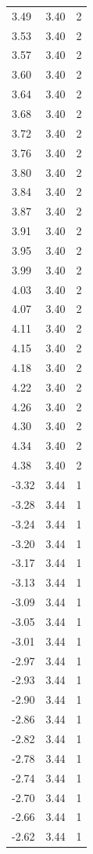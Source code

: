 \begin{longtable}{lrr}
  3.49 & 3.40 & 2 \\
  3.53 & 3.40 & 2 \\
  3.57 & 3.40 & 2 \\
  3.60 & 3.40 & 2 \\
  3.64 & 3.40 & 2 \\
  3.68 & 3.40 & 2 \\
  3.72 & 3.40 & 2 \\
  3.76 & 3.40 & 2 \\
  3.80 & 3.40 & 2 \\
  3.84 & 3.40 & 2 \\
  3.87 & 3.40 & 2 \\
  3.91 & 3.40 & 2 \\
  3.95 & 3.40 & 2 \\
  3.99 & 3.40 & 2 \\
  4.03 & 3.40 & 2 \\
  4.07 & 3.40 & 2 \\
  4.11 & 3.40 & 2 \\
  4.15 & 3.40 & 2 \\
  4.18 & 3.40 & 2 \\
  4.22 & 3.40 & 2 \\
  4.26 & 3.40 & 2 \\
  4.30 & 3.40 & 2 \\
  4.34 & 3.40 & 2 \\
  4.38 & 3.40 & 2 \\
  -3.32 & 3.44 & 1 \\
  -3.28 & 3.44 & 1 \\
  -3.24 & 3.44 & 1 \\
  -3.20 & 3.44 & 1 \\
  -3.17 & 3.44 & 1 \\
  -3.13 & 3.44 & 1 \\
  -3.09 & 3.44 & 1 \\
  -3.05 & 3.44 & 1 \\
  -3.01 & 3.44 & 1 \\
  -2.97 & 3.44 & 1 \\
  -2.93 & 3.44 & 1 \\
  -2.90 & 3.44 & 1 \\
  -2.86 & 3.44 & 1 \\
  -2.82 & 3.44 & 1 \\
  -2.78 & 3.44 & 1 \\
  -2.74 & 3.44 & 1 \\
  -2.70 & 3.44 & 1 \\
  -2.66 & 3.44 & 1 \\
  -2.62 & 3.44 & 1 \\

\end{longtable}
